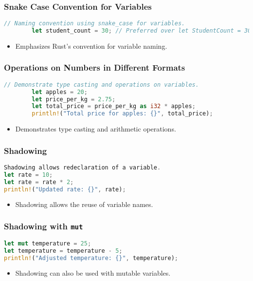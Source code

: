 \documentclass[aspectratio=169, table]{beamer}
\begin{document}
\begin{frame}[fragile]
	\frametitle{Snake Case Convention for Variables}
	\begin{lstlisting}[language=Rust]
		// Naming convention using snake_case for variables.
		let student_count = 30; // Preferred over let StudentCount = 30;
	\end{lstlisting}
	\begin{itemize}
		\item Emphasizes Rust's convention for variable naming.
	\end{itemize}
\end{frame}

\begin{frame}[fragile]
	\frametitle{Operations on Numbers in Different Formats}
	\begin{lstlisting}[language=Rust]
		// Demonstrate type casting and operations on variables.
		let apples = 20;
		let price_per_kg = 2.75;
		let total_price = price_per_kg as i32 * apples;
		println!("Total price for apples: {}", total_price);
	\end{lstlisting}
	\begin{itemize}
		\item Demonstrates type casting and arithmetic operations.
	\end{itemize}
\end{frame}

\begin{frame}[fragile]
\frametitle{Shadowing}
\begin{lstlisting}[language=Rust]
Shadowing allows redeclaration of a variable.
let rate = 10;
let rate = rate * 2;
println!("Updated rate: {}", rate);
\end{lstlisting}
\begin{itemize}
\item Shadowing allows the reuse of variable names.
\end{itemize}
\end{frame}

\begin{frame}[fragile]
\frametitle{Shadowing with \texttt{mut}}
\begin{lstlisting}[language=Rust]
let mut temperature = 25;
let temperature = temperature - 5;
println!("Adjusted temperature: {}", temperature);
\end{lstlisting}
\begin{itemize}
\item Shadowing can also be used with mutable variables.
\end{itemize}
\end{frame}
\end{document}

